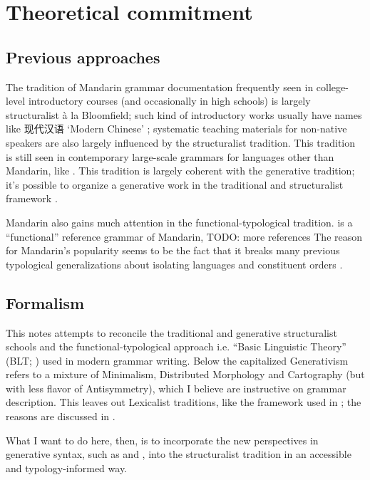 \documentclass[UTF8, a4paper, oneside, scheme=plain, 12pt]{ctexrep}
\newcommand*{\citechap}[1]{chap.~{#1}}
\newcommand{\ala}{à la}
\newcommand{\translate}[1]{`#1'}
\begin{document}
\section{Theoretical commitment}\label{sec:theory}

{\small

\subsection{Previous approaches}

The tradition of Mandarin grammar documentation
frequently seen in college-level introductory courses (and occasionally in high schools) 
is largely structuralist \ala{} Bloomfield;
such kind of introductory works 
usually have names like 现代汉语 \translate{Modern Chinese}
\citep{xianhan2004};
systematic teaching materials for non-native speakers  
are also largely influenced by the structuralist tradition.
This tradition is still seen in contemporary large-scale grammars 
for languages other than Mandarin,
like \citet{cgel}.
This tradition is largely coherent with the generative tradition;
it's possible to 
organize a generative work in the traditional and structuralist framework \citep{deng2010formal}.

Mandarin also gains much attention in the functional-typological tradition.
\citet{li1989mandarin} is a ``functional'' reference grammar of Mandarin, TODO: more references
The reason for Mandarin's popularity seems to be the fact that 
it breaks many previous typological generalizations about isolating languages and constituent orders
\citep[\citechap{8}]{paul2014new}.


\subsection{Formalism}

This notes attempts to reconcile 
the traditional and generative structuralist schools
and the functional-typological approach
i.e. ``Basic Linguistic Theory'' (BLT; \citealt{dixon2009basic})
used in modern grammar writing.
Below the capitalized Generativism
refers to a mixture of Minimalism, Distributed Morphology and Cartography
(but with less flavor of Antisymmetry),
which I believe are instructive on grammar description.
This leaves out Lexicalist traditions, 
like the framework used in \citet{deng2010formal};
the reasons are discussed in .

What I want to do here, then, 
is to incorporate the new perspectives in generative syntax, 
such as \citet{paul2014new} and \citet{paul2008serial},
into the structuralist tradition
in an accessible and typology-informed way.

}
\end{document}
